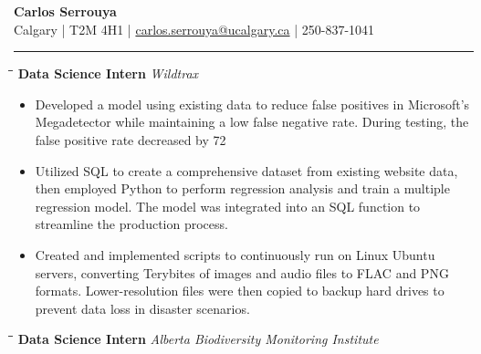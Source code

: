 \documentclass[a4paper,11pt]{article}
\def\jobh{\hspace{-1ex}}
\def\locationh{\hspace{7cm}}
\def\dateh{\hspace{10cm}}
\def\titlev{\vspace{.5cm}}
\def\sectionv{\vspace{0cm}}
\def\subsectionv{\vspace{-5ex}}
\def\postpointsv{\vspace{0cm}}
\begin{document}
\begin{center}
    {\LARGE \textbf{Carlos Serrouya}} \\
    Calgary | T2M 4H1 | \href{mailto:carlos.serrouya@ucalgary.ca}{carlos.serrouya@ucalgary.ca} | 250-837-1041 \\
\end{center}

\titlev

\noindent {}
\vspace{-2.35em} %
\par\noindent
\rule{\textwidth}{0.4pt}

\sectionv

\noindent \begin{tabbing}
    \jobh \= \locationh \= \dateh \= \kill
    \> \textbf{Data Science Intern} \> \textit{Wildtrax} \\
\end{tabbing}

\begin{itemize}[leftmargin=.5cm, itemsep=.1cm, before=\subsectionv, after=\postpointsv]
	\item Developed a model using existing data to reduce false positives in Microsoft's Megadetector while maintaining a low false negative rate. During testing, the false positive rate decreased by 72%
	\item Utilized SQL to create a comprehensive dataset from existing website data, then employed Python to perform regression analysis and train a multiple regression model. The model was integrated into an SQL function to streamline the production process.
	\item Created and implemented scripts to continuously run on Linux Ubuntu servers, converting Terybites of images and audio files to FLAC and PNG formats. Lower-resolution files were then copied to backup hard drives to prevent data loss in disaster scenarios.
\end{itemize}

\vspace{0.5cm}

\begin{tabbing}
    \jobh \= \locationh \= \dateh \= \kill
    \> \textbf{Data Science Intern} \> \textit{Alberta Biodiversity Monitoring Institute} \\
\end{tabbing}
\end{document}
